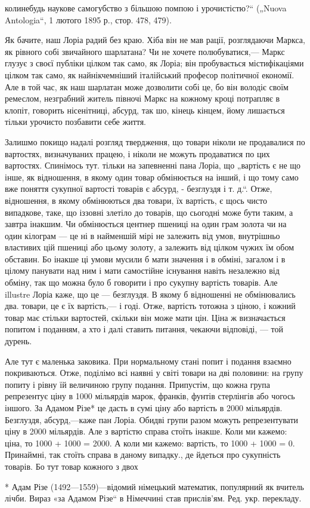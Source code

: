 \parcont{}  %
колинебудь наукове самогубство з більшою помпою і урочистістю?“  („Nuova Antologia“, 1 лютого
1895 р., стор. 478, 479).

Як бачите, наш Лоріа радий без краю. Хіба він не мав рації, розглядаючи
Маркса, як рівного собі звичайного шарлатана?  Чи не хочете полюбуватися,— Маркс глузує з своєї
публіки цілком так само, як Лоріа; він пробувається містифікаціями цілком так само, як
найнікчемніший італійський професор політичної економії. Але в той час, як наш шарлатан може
дозволити собі це, бо він володіє своїм ремеслом, незграбний житель півночі Маркс на кожному
кроці потрапляє в клопіт, говорить нісенітниці, абсурд, так шо, кінець кінцем, йому лишається
тільки урочисто позбавити себе життя.

Залишмо покищо надалі розгляд твердження, що товари ніколи
не продавалися по вартостях, визначуваних працею, і ніколи не можуть продаватися по цих
вартостях. Спинімось тут. тільки на запевненні пана Лоріа, що „вартість є не що інше, як
відношення, в якому один товар обмінюється на інший, і що тому само вже поняття сукупної вартості
товарів є абсурд, - безглуздя і т. д.“. Отже, відношення, в якому обмінюються два товари, їх
вартість, є щось чисто випадкове, таке, що іззовні злетіло до товарів, що сьогодні може бути
таким, а завтра інакшим. Чи обмінюється центнер пшениці на один грам золота чи на один кілограм —
це ні в найменшій мірі не залежить від умов, внутрішньо властивих цій пшениці або цьому золоту,
а залежить від цілком чужих їм обом обставин. Бо інакше ці умови мусили б мати значення і в
обміні, загалом і в цілому панувати над ним і мати самостійне існування навіть незалежно від
обміну, так що можна було б говорити і про сукупну вартість товарів. Але illustre  Лоріа каже, що
це — безглуздя. В якому б відношенні не обмінювались два. товари, це є їх вартість,— і годі.
Отже, вартість тотожна з ціною, і кожний товар має стільки вартостей, скільки він може мати цін.
Ціна ж визначається попитом і поданням, а хто і далі ставить питання, чекаючи відповіді, — той
дурень.

Але тут є маленька заковика. При нормальному стані попит і подання взаємно покриваються.
Отже, поділімо всі наявні у світі товари на дві половини: на групу попиту і рівну їй величиною
групу подання. Припустім, що кожна група репрезентує ціну в 1000 мільярдів марок, франків,
фунтів стерлінгів або чогось іншого. За Адамом Різе* це дасть в сумі ціну або вартість в 2000
мільярдів. Безглуздя, абсурд,—каже пан Лоріа. Обидві групи разом можуть репрезентувати ціну в
2000 мільярдів. Але з вартістю справа стоїть інакше. Коли ми кажемо:  ціна, то 1000 + 1000 =
2000. А коли ми кажемо: вартість, то 1000 + 1000 = 0. Принаймні, так стоїть справа в даному
випадку., де йдеться про сукупність товарів. Бо тут товар кожного з двох

* Адам Різе (1492—1559)—відомий німецький математик, популярний як вчитель лічби. Вираз «за Адамом Різе“ в Німеччині став прислів’ям. Ред. укр. перекладу.
\parbreak{}
